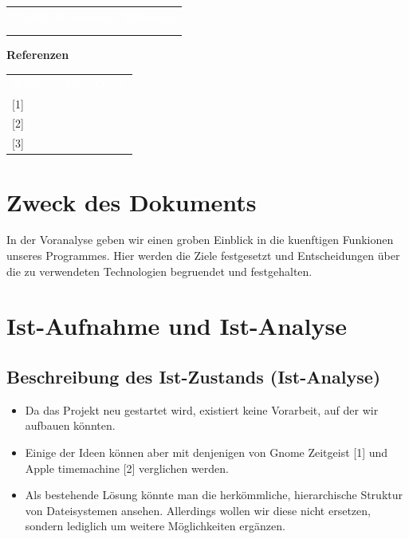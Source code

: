 \documentclass[10pt,paper=a4,final]{scrartcl}
\begin{document}
\begin{tabularx}{\textwidth}{l X}
\textcolor{white}{Begriff/ Abkuerzung}\cellcolor{blue!80!} & \textcolor{white}{Bedeutung}\cellcolor{blue!80!} \\
\cellcolor{blue!20!} & \cellcolor{blue!20!} \\
\cellcolor{blue!20!} & \cellcolor{blue!20!} \\
\end{tabularx}
\newline
\newline
\newline
{\bf Referenzen}
\newline

\begin{tabularx}{\textwidth}{l X}
\textcolor{white}{Referenz}\cellcolor{blue!80!} & \textcolor{white}{Titel, Quelle}\cellcolor{blue!80!} \\
\cellcolor{blue!20!}[1] & \cellcolor{blue!20!} \\
\cellcolor{blue!20!}[2] & \cellcolor{blue!20!} \\
\cellcolor{blue!20!}[3] & \cellcolor{blue!20!} \\
\end{tabularx}
\newpage
\tableofcontents
\newpage

\section{Zweck des Dokuments}
In der Voranalyse geben wir einen groben Einblick in die kuenftigen Funkionen unseres Programmes. Hier werden die Ziele festgesetzt und Entscheidungen \"uber die zu verwendeten Technologien begruendet und festgehalten.
\section{Ist-Aufnahme und Ist-Analyse}
\subsection{Beschreibung des Ist-Zustands (Ist-Analyse)}
\begin{itemize}
  \item Da das Projekt neu gestartet wird, existiert keine Vorarbeit, auf der wir aufbauen könnten.
  \item Einige der Ideen können aber mit denjenigen von Gnome Zeitgeist [1] und Apple timemachine [2] verglichen werden.
  \item Als bestehende Lösung könnte man die herkömmliche, hierarchische Struktur von Dateisystemen ansehen. Allerdings wollen wir diese nicht ersetzen, sondern lediglich um weitere Möglichkeiten ergänzen.
\end{itemize}
\end{document}

